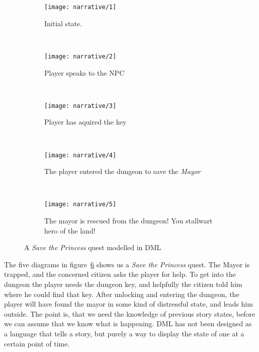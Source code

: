 \begin{figure}[h]
	\centering
	\begin{subfigure}[b]{0.4\textwidth}
		\texttt{[image: narrative/1]}
		\caption{Initial state.}\label{fig:narrative:1}
	\end{subfigure}
		~
	\begin{subfigure}[b]{0.4\textwidth}
		\texttt{[image: narrative/2]}
		\caption{Player speaks to the NPC}\label{fig:narrative:2}
	\end{subfigure}
		~
	\begin{subfigure}[b]{0.4\textwidth}
		\texttt{[image: narrative/3]}
		\caption{Player has aquired the key}\label{fig:narrative:3}
	\end{subfigure}
		~
	\begin{subfigure}[b]{0.4\textwidth}
		\texttt{[image: narrative/4]}
		\caption{The player entered the dungeon to save the \textit{Mayor}}\label{fig:narrative:4}
	\end{subfigure}
	~
	\begin{subfigure}[b]{0.4\textwidth}
		\texttt{[image: narrative/5]}
		\caption{The mayor is rescued from the dungeon! You stallwart hero of the land!}\label{fig:narrative:5}
	\end{subfigure}
	\caption{A \textit{Save the Princess} quest modelled in DML}\label{fig:narrative}
\end{figure}

The five diagrams in figure~\ref{fig:narrative} shows us a \textit{Save the Princess} quest. The Mayor is trapped, and the concerned citizen asks the player for help. To get into the dungeon the player needs the dungeon key, and helpfully the citizen told him where he could find that key. After unlocking and entering the dungeon, the player will have found the mayor in some kind of distressful state, and leads him outside.
The point is, that we need the knowledge of previous story states, before we can assume that we know what is happening. 
DML has not been designed as a language that tells a story, but purely a way to display the state of one at a certain point of time.

